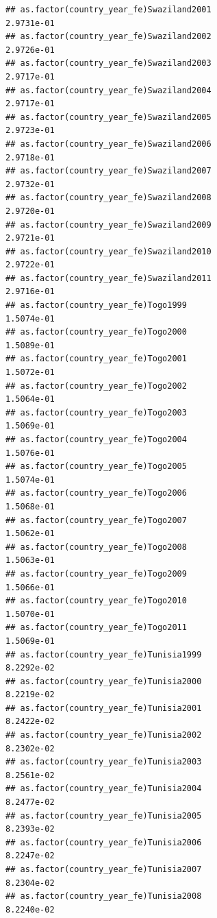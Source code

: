 \documentclass[
  a4paper,
]{article}
\begin{document}
\begin{verbatim}
## as.factor(country_year_fe)Swaziland2001                         2.9731e-01
## as.factor(country_year_fe)Swaziland2002                         2.9726e-01
## as.factor(country_year_fe)Swaziland2003                         2.9717e-01
## as.factor(country_year_fe)Swaziland2004                         2.9717e-01
## as.factor(country_year_fe)Swaziland2005                         2.9723e-01
## as.factor(country_year_fe)Swaziland2006                         2.9718e-01
## as.factor(country_year_fe)Swaziland2007                         2.9732e-01
## as.factor(country_year_fe)Swaziland2008                         2.9720e-01
## as.factor(country_year_fe)Swaziland2009                         2.9721e-01
## as.factor(country_year_fe)Swaziland2010                         2.9722e-01
## as.factor(country_year_fe)Swaziland2011                         2.9716e-01
## as.factor(country_year_fe)Togo1999                              1.5074e-01
## as.factor(country_year_fe)Togo2000                              1.5089e-01
## as.factor(country_year_fe)Togo2001                              1.5072e-01
## as.factor(country_year_fe)Togo2002                              1.5064e-01
## as.factor(country_year_fe)Togo2003                              1.5069e-01
## as.factor(country_year_fe)Togo2004                              1.5076e-01
## as.factor(country_year_fe)Togo2005                              1.5074e-01
## as.factor(country_year_fe)Togo2006                              1.5068e-01
## as.factor(country_year_fe)Togo2007                              1.5062e-01
## as.factor(country_year_fe)Togo2008                              1.5063e-01
## as.factor(country_year_fe)Togo2009                              1.5066e-01
## as.factor(country_year_fe)Togo2010                              1.5070e-01
## as.factor(country_year_fe)Togo2011                              1.5069e-01
## as.factor(country_year_fe)Tunisia1999                           8.2292e-02
## as.factor(country_year_fe)Tunisia2000                           8.2219e-02
## as.factor(country_year_fe)Tunisia2001                           8.2422e-02
## as.factor(country_year_fe)Tunisia2002                           8.2302e-02
## as.factor(country_year_fe)Tunisia2003                           8.2561e-02
## as.factor(country_year_fe)Tunisia2004                           8.2477e-02
## as.factor(country_year_fe)Tunisia2005                           8.2393e-02
## as.factor(country_year_fe)Tunisia2006                           8.2247e-02
## as.factor(country_year_fe)Tunisia2007                           8.2304e-02
## as.factor(country_year_fe)Tunisia2008                           8.2240e-02

\end{verbatim}
\end{document}
